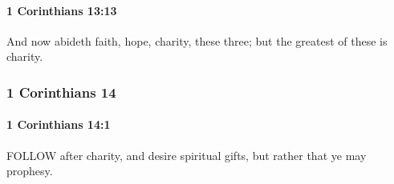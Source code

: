 		\paragraph{1 Corinthians 13:13} %
			\label{1CORINTHIANS-13-13}

			And now abideth faith, hope, charity, these three; but the greatest of these is charity.

			\begin{framed}
				\scriptsize
				\begin{compactdesc}
					\item[SBLG] 
				\end{compactdesc}
			\end{framed}

	\subsubsection{1 Corinthians 14} %
		\label{1CORINTHIANS-14}
		
		\paragraph{1 Corinthians 14:1} %
			\label{1CORINTHIANS-14-1}

			FOLLOW after charity, and desire spiritual gifts, but rather that ye may prophesy.

